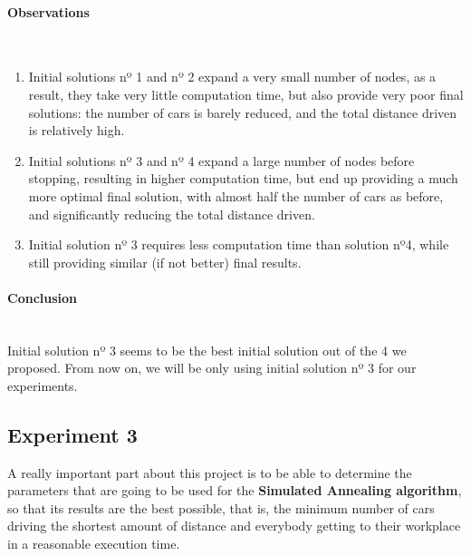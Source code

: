 \documentclass[12]{article}
\begin{document}
\paragraph{Observations}\mbox{}\\
\begin{enumerate}
\item Initial solutions nº 1 and nº 2 expand a very small number of nodes, as a result, they take very little computation time,
but also provide very poor final solutions: the number of cars is barely reduced, and the total distance driven is relatively high.

\item Initial solutions nº 3 and nº 4 expand a large number of nodes before stopping, resulting in higher computation time,
but end up providing a much more optimal final solution, with almost half the number of cars as before, and significantly reducing the total distance driven.

\item Initial solution nº 3 requires less computation time than solution nº4, while still providing similar (if not better) final results.

\end{enumerate}

\paragraph{Conclusion}\mbox{}\\
Initial solution nº 3 seems to be the best initial solution out of the 4 we proposed.
From now on, we will be only using initial solution nº 3 for our experiments.

\subsection{Experiment 3}

A really important part about this project is to be able to determine the parameters that are going to be used for the \textbf{Simulated Annealing algorithm}, so that its results are the best possible, that is, the minimum number of cars driving the shortest amount of distance and everybody getting to their workplace in a reasonable execution time. 
\\
\medskip
\end{document}
